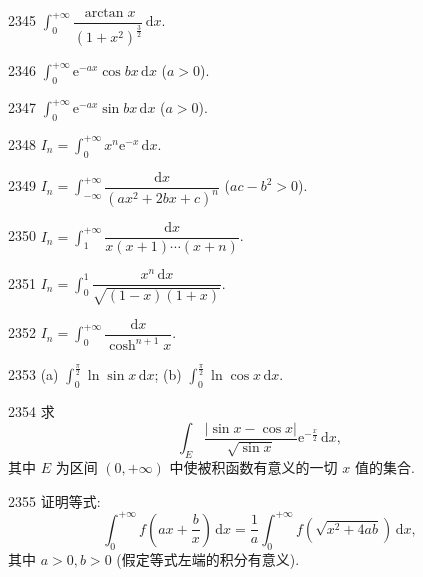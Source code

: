 \begin{prob}[S]{2345}
$\int_{0}^{+\infty} \dfrac{\arctan x}{(1 + x^2)^{\frac{3}{2}}}\,\mathrm{d}x$.
\end{prob}

\begin{prob}[S]{2346}
$\int_{0}^{+\infty} \mathrm{e}^{-ax}\cos bx\,\mathrm{d}x$ ($a > 0$).
\end{prob}

\begin{prob}[S]{2347}
$\int_{0}^{+\infty} \mathrm{e}^{-ax}\sin bx\,\mathrm{d}x$ ($a > 0$).
\end{prob}


\begin{prob}[S]{2348}
$I_n = \int_{0}^{+\infty} x^n \mathrm{e}^{-x}\,\mathrm{d}x$.
\end{prob}

\begin{prob}[S]{2349}
$I_n = \int_{-\infty}^{+\infty} \dfrac{\mathrm{d}x}{(ax^2 + 2bx + c)^n}$ ($ac - b^2 > 0$).
\end{prob}

\begin{prob}[S]{2350}
$I_n = \int_{1}^{+\infty} \dfrac{\mathrm{d}x}{x(x + 1)\cdots(x + n)}$.
\end{prob}

\begin{prob}[S]{2351}
$I_n = \int_{0}^{1} \dfrac{x^n\,\mathrm{d}x}{\sqrt{(1 - x)(1 + x)}}$.
\end{prob}

\begin{prob}[S]{2352}
$I_n = \int_{0}^{+\infty} \dfrac{\mathrm{d}x}{\cosh^{n+1} x}$.
\end{prob}

\begin{prob}[M]{2353}
(a) $\int_{0}^{\frac{\pi}{2}} \ln\sin x\,\mathrm{d}x$; \qquad (b) $\int_{0}^{\frac{\pi}{2}} \ln\cos x\,\mathrm{d}x$.
\end{prob}

\begin{prob}[M]{2354}
求
\[
\int_E \frac{|\sin x - \cos x|}{\sqrt{\sin x}} \mathrm{e}^{-\frac{x}{2}}\,\mathrm{d}x,
\]
其中 $E$ 为区间 $(0, +\infty)$ 中使被积函数有意义的一切 $x$ 值的集合.
\end{prob}

\begin{prob}[M]{2355}
证明等式:
\[
\int_0^{+\infty} f\left(ax + \frac{b}{x}\right)\,\mathrm{d}x = \frac{1}{a} \int_0^{+\infty} f\left(\sqrt{x^2 + 4ab}\right)\,\mathrm{d}x,
\]
其中 $a > 0, b > 0$ (假定等式左端的积分有意义).
\end{prob}

